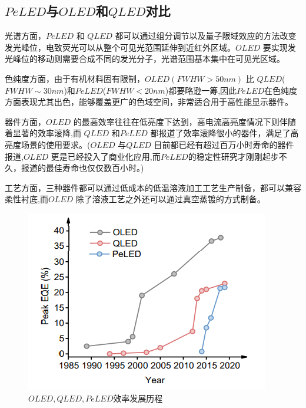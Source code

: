 \documentclass{beamer}[fontset=windows]
\begin{document}
\subsection{$PeLED$与$OLED$和$QLED$对比}
\begin{frame}
\begin{itemize}\small{
	\item 光谱方面，$PeLED$ 和 $QLED$ 都可以通过组分调节以及量子限域效应的方法改变发光峰位，电致荧光可以从整个可见光范围延伸到近红外区域。$OLED$ 要实现发光峰位的移动则需要合成不同的发光分子，光谱范围基本集中在可见光区域。
	\item 色纯度方面，由于有机材料固有限制，$OLED(FWHW>50 nm)$ 比 $QLED$($FWHW\sim 30 nm$)和$PeLED$($FWHW< 20 nm$)都要略逊一筹,因此$PeLED $在色纯度方面表现尤其出色，能够覆盖更广的色域空间，非常适合用于高性能显示器件。
	\item 器件方面，$OLED$ 的最高效率往往在低亮度下达到，高电流高亮度情况下则伴随着显著的效率滚降,而 $QLED$ 和$PeLED$ 都报道了效率滚降很小的器件，满足了高亮度场景的使用要求。($OLED$ 与$QLED$ 目前都已经有超过百万小时寿命的器件报道,$OLED$ 更是已经投入了商业化应用,而$PeLED$的稳定性研究才刚刚起步不久，报道的最佳寿命也仅仅数百小时\cite{wang2019trifluoroacetate}。)
	\item 工艺方面，三种器件都可以通过低成本的低温溶液加工工艺生产制备，都可以兼容柔性衬底,而$OLED$ 除了溶液工艺之外还可以通过真空蒸镀的方式制备。
}
\end{itemize}
\end{frame}
\begin{frame}
	\begin{figure}[H]
		\centering
		\hspace{2em}\includegraphics[width=.8\linewidth]{pic/5.png}
		\caption{$OLED, QLED, PeLED $效率发展历程
		}
	\end{figure}
\end{frame}
\end{document}
